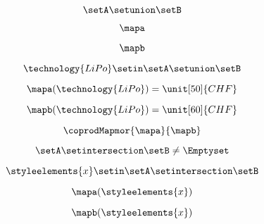 {\begin{forslides}
        \begin{equation}
            \label{eq:feedback-108}
            \setA\setunion \setB
        \end{equation}

        \begin{equation}
            \label{eq:feedback-109}
            \mapa
        \end{equation}

        \begin{equation}
            \label{eq:feedback-110}
            \mapb
        \end{equation}

        \begin{equation}
            \label{eq:feedback-111}
            \technology{LiPo}\setin \setA\setunion \setB
        \end{equation}

        \begin{equation}
            \label{eq:feedback-112}
            \mapa(\technology{LiPo})=\unit[50]{CHF}
        \end{equation}

        \begin{equation}
            \label{eq:feedback-113}
            \mapb(\technology{LiPo})=\unit[60]{CHF}
        \end{equation}

        \begin{equation}
            \label{eq:feedback-114}
            \coprodMapmor{\mapa}{\mapb}
        \end{equation}

        \begin{equation}
            \label{eq:feedback-115}
            \setA\setintersection \setB\neq \Emptyset
        \end{equation}

        \begin{equation}
            \label{eq:feedback-116}
            \styleelements{x}\setin \setA\setintersection \setB
        \end{equation}

        \begin{equation}
            \label{eq:feedback-117}
            \mapa(\styleelements{x})
        \end{equation}

        \begin{equation}
            \label{eq:feedback-118}
            \mapb(\styleelements{x})
        \end{equation}


\end{forslides}}
